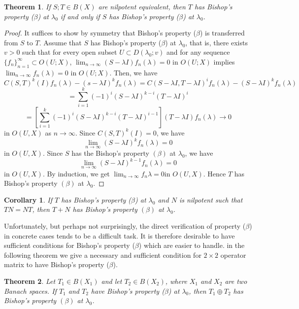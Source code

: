 \documentclass[12pt,a4paper]{amsart}
\newtheorem{corollary}{Corollary}[section]
\newtheorem{theorem}{Theorem}[section]
\begin{document}
\begin{theorem} If $S; T \in B(X)$ are nilpotent equivalent, then $T$ has Bishop's
property ($\beta$) at $\lambda_{0}$ if and only if $S$ has
Bishop's property ($\beta$) at $\lambda_{0}$.
\end{theorem}
\begin{proof} It suffices to show by symmetry that
Bishop's property ($\beta$) is transferred from $S$ to $T$. Assume
that $S$ has Bishop's property ($\beta$) at $\lambda_{0}$, that
is, there exists $v > 0$ such that for every open subset $U
\subset D(\lambda_{0}; v)$ and for any sequence
$\{f_{n}\}^{\infty}_{ n=1} \subset O(U;X)$, $\lim_{n\rightarrow
\infty}(S - \lambda I)f_{n}(\lambda) = 0$ in $O(U;X)$ implies
$\lim_{n\rightarrow \infty} f_{n}(\lambda) = 0$ in $O(U;X)$. Then,
we have $$C(S, T)^{k}(I)f_{n}(\lambda)-(s-\lambda
I)^{k}f_{n}(\lambda)= C(S-\lambda I, T-\lambda
I)^{i}f_{n}(\lambda)- (S-\lambda I)^{k}f_{n}(\lambda)$$
$$=\sum^{k}_{i=1}(-1)^{i}(S-\lambda I)^{k-i}(T-\lambda
I)^{i}$$
$$= [\sum^{k}_{i=1}(-1)^{i}(S-\lambda I)^{k-i}(T-\lambda
I)^{i-1}](T-\lambda I)f_{n}(\lambda)\rightarrow 0$$
 in $O(U, X)$ as $n\rightarrow\infty$. Since $C(S, T)^{k}(I)=0$,
 we have $$\lim_{n\rightarrow\infty}(S-\lambda
 I)^{k}f_{n}(\lambda)=0$$ in $O(U, X)$.
 Since $S$ has the Bishop's property $(\beta)$ at $\lambda_{0}$,
 we have $$\lim_{n\rightarrow\infty}(S-\lambda
 I)^{k-1}f_{n}(\lambda)=0$$ in $O(U, X)$. By induction, we get
 $\lim_{n\rightarrow\infty}f_{n}{\lambda}=0$in $O(U, X)$. Hence
 $T$ has Bishop's property $(\beta)$ at $\lambda_{0}$.
\end{proof}
\begin{corollary} If $T$ has Bishop's property ($\beta$) at $\lambda_{0}$ and $N$ is nilpotent
such that $TN = NT$, then $T + N$ has Bishop's property $(\beta)$
at $\lambda_{0}$.
\end{corollary}
Unfortunately, but perhaps not surprisingly, the direct
verification of property ($\beta$) in concrete cases tends to be a
difficult task. It is therefore desirable to have sufficient
conditions for  Bishop's property ($\beta$) which are easier to
handle. in the following theorem we give a necessary and
sufficient condition for $2 \times 2$ operator matrix to have
Bishop's property ($\beta$).
\begin{theorem} Let $T_{1}\in B(X_{1})$ and let $T_{2}\in B(X_{2})$, where $X_{1}$ and
$X_{2}$ are two Banach spaces. If $T_{1}$ and $T_{2}$ have
Bishop's property ($\beta$) at $\lambda_{0}$, then $T_{1}\oplus
T_{2}$ has Bishop's property $(\beta)$ at $\lambda_{0}$.
\end{theorem}
\end{document}
